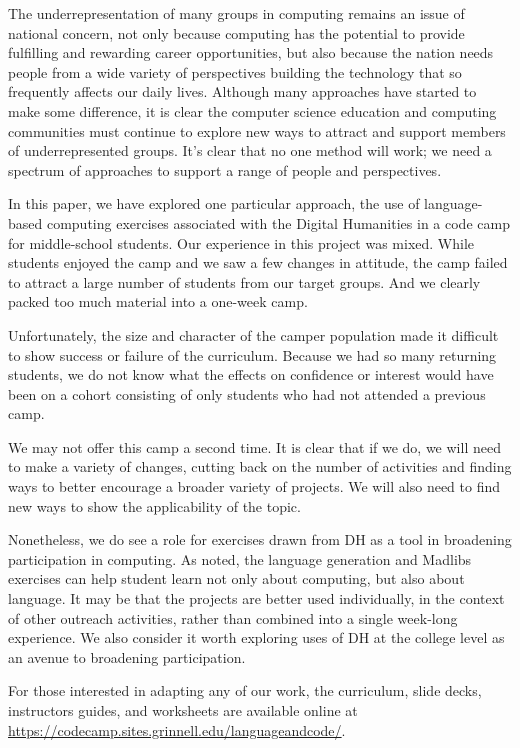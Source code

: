 The underrepresentation of many groups in computing remains an issue
of national concern, not only because computing has the potential
to provide fulfilling and rewarding career opportunities, but also
because the nation needs people from a wide variety of perspectives
building the technology that so frequently affects our daily lives.
Although many approaches have started to make some difference, it
is clear the computer science education and computing communities
must continue to explore new ways to attract and support members
of underrepresented groups.  It's clear that no one method will
work; we need a spectrum of approaches to support a range of
people and perspectives.

In this paper, we have explored one particular approach, the use
of language-based computing exercises associated with the Digital
Humanities in a code camp for middle-school students.  Our experience
in this project was mixed.  While students enjoyed the camp
and we saw a few changes in attitude, the camp failed to attract a
large number of students from our target groups.  And we clearly
packed too much material into a one-week camp.

Unfortunately, the size and character of the camper population made
it difficult to show success or failure of the curriculum.  Because
we had so many returning students, we do not know what the effects
on confidence or interest would have been on a cohort consisting
of only students who had not attended a previous camp.

We may not offer this camp a second time.  It is clear that if we
do, we will need to make a variety of changes, cutting back on the
number of activities and finding ways to better encourage a broader
variety of projects.  We will also need to find new ways to show
the applicability of the topic.

Nonetheless, we do see a role for exercises drawn from DH as a tool
in broadening participation in computing.  As noted, the language
generation and Madlibs exercises can help student learn not only
about computing, but also about language.  It may be that the
projects are better used individually, in the context of other
outreach activities, rather than combined into a single week-long
experience.  We also consider it worth exploring uses of DH
at the college level as an avenue to broadening participation.

For those interested in adapting any of our work, the curriculum,
slide decks, instructors guides, and worksheets are available online
at \url{https://codecamp.sites.grinnell.edu/languageandcode/}.
